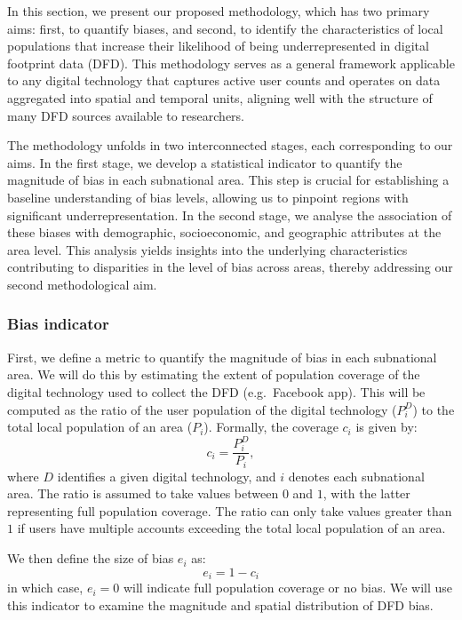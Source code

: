 \documentclass[]{rsos}%
\begin{document}
In this section, we present our proposed methodology, which has two primary aims: first, to quantify biases, and second, to identify the characteristics of local populations that increase their likelihood of being underrepresented in digital footprint data (DFD). This methodology serves as a general framework applicable to any digital technology that captures active user counts and operates on data aggregated into spatial and temporal units, aligning well with the structure of many DFD sources available to researchers.

The methodology unfolds in two interconnected stages, each corresponding to our aims. In the first stage, we develop a statistical indicator to quantify the magnitude of bias in each subnational area. This step is crucial for establishing a baseline understanding of bias levels, allowing us to pinpoint regions with significant underrepresentation. In the second stage, we analyse the association of these biases with demographic, socioeconomic, and geographic attributes at the area level. This analysis yields insights into the underlying characteristics contributing to disparities in the level of bias across areas, thereby addressing our second methodological aim.

\subsubsection{Bias indicator}\label{bias-indicator}

First, we define a metric to quantify the magnitude of bias in each subnational area. We will do this by estimating the extent of population coverage of the digital technology used to collect the DFD (e.g.~Facebook app). This will be computed as the ratio of the user population of the digital technology (\(P_i^D\)) to the total local population of an area (\(P_i\)). Formally, the coverage \(c_i\) is given by:
\begin{equation}
c_i = \dfrac{P_i^D}{P_i},
\end{equation}
where \(𝐷\) identifies a given digital technology, and \(i\) denotes each subnational area. The
ratio is assumed to take values between \(0\) and \(1\), with the latter representing full population coverage.
The ratio can only take values greater than \(1\) if users have multiple accounts exceeding the total local
population of an area.

We then define the size of bias \(e_i\) as:
\begin{equation}
e_i = 1 - c_i
\end{equation}
in which case, \(e_i = 0\) will indicate full population coverage or no bias. We will use this indicator to examine the magnitude and spatial distribution of DFD bias.
\end{document}
